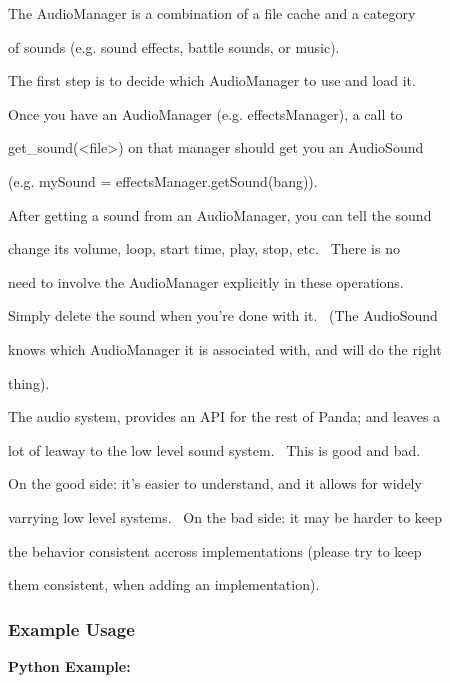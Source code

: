 \documentclass[a4paper]{article}
\begin{document}
{\color{black}
The AudioManager is a combination of a file cache and a category}

{\color{black}
of sounds (e.g. sound effects, battle sounds, or music).}


\bigskip

{\color{black}
The first step is to decide which AudioManager to use and load it.}


\bigskip

{\color{black}
Once you have an AudioManager (e.g. effectsManager), a call to }

{\color{black}
get\_sound({\textless}file{\textgreater}) on that manager should get you an AudioSound}

{\color{black}
(e.g. mySound = effectsManager.getSound({\textquotedbl}bang{\textquotedbl})).}


\bigskip

{\color{black}
After getting a sound from an AudioManager, you can tell the sound }

{\color{black}
change its volume, loop, start time, play, stop, etc. \ There is no }

{\color{black}
need to involve the AudioManager explicitly in these operations.}


\bigskip

{\color{black}
Simply delete the sound when you're done with it. \ (The AudioSound }

{\color{black}
knows which AudioManager it is associated with, and will do the right}

{\color{black}
thing).}


\bigskip

{\color{black}
The audio system, provides an API for the rest of Panda; and leaves a }

{\color{black}
lot of leaway to the low level sound system. \ This is good and bad. \ }

{\color{black}
On the good side: it's easier to understand, and it allows for widely}

{\color{black}
varrying low level systems. \ On the bad side: it may be harder to keep}

{\color{black}
the behavior consistent accross implementations (please try to keep }

{\color{black}
them consistent, when adding an implementation).}


\bigskip

\subsubsection[Example Usage]{Example Usage}
\hypertarget{RefHeading4106869075401}{}{\bfseries
\hypertarget{RefHeading4108869075401}{}Python Example:}
\end{document}
